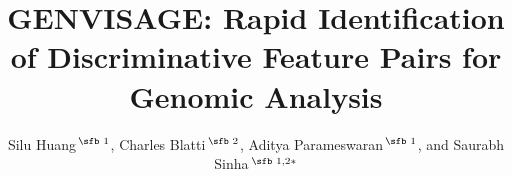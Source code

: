 \documentclass{bioinfo}
\begin{document}

\subtitle{} %

\title[short Title]{G{\large ENVISAGE}: Rapid Identification of Discriminative Feature Pairs for Genomic Analysis}

\author[Huang \textit{et~al}.]{Silu Huang\,$^{\text{\sfb 1}}$, Charles Blatti\,$^{\text{\sfb 2}}$, Aditya Parameswaran\,$^{\text{\sfb 1}}$, and Saurabh Sinha\,$^{\text{\sfb 1,2}*}$}

\address{$^{\text{\sf 1}}$Department of Computer Science, University of Illinois Urbana-Champaign, Urbana, IL, 61801, USA and \\
$^{\text{\sf 2}}$Institute of Genomic Biology, University of Illinois Urbana-Champaign, Urbana, IL, 61801, USA.}

\author[]{} %




\address{} %

\corresp{} %

\history{} %

\editor{} %
\end{document}
